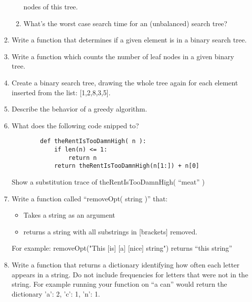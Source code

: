 \documentclass[11pt]{article}
\begin{document}
\begin{enumerate}
\begin{enumerate}
            nodes of this tree.
                \vspace{.25in}
            \item What's the worst case search time for an (unbalanced) search
            tree?
                \pagebreak
        \end{enumerate}
    \item Write a function that determines if a given element is in a binary search tree.
        \vspace{3in}
    \item Write a function which counts the number of leaf nodes in a given binary tree.
        \pagebreak
    \item Create a binary search tree, drawing the whole tree
        again for each element inserted from the list: [1,2,8,3,5].
        \vspace{6in}
    \item Describe the behavior of a greedy algorithm.
        \pagebreak

    \item What does the following code snipped to?
        \begin{verbatim}
        def theRentIsTooDamnHigh( n ):
            if len(n) <= 1:
                return n
            return theRentIsTooDamnHigh(n[1:]) + n[0]
        \end{verbatim}
            \vspace{1in}
        Show a substitution trace of theRentIsTooDamnHigh( ``meat'' )
            \vspace{2in}
    \item Write a function called ``removeOpt( string )'' that:
        \begin{itemize}
            \item Takes a string as an argument
            \item returns a string with all substrings in [brackets] removed.
        \end{itemize}
        For example:    
            removeOpt("This [is] [a] [nice] string")
            returns ``this   string'' 
        \pagebreak
    
    \item Write a function that returns a dictionary identifying how often each
    letter appears in a string. Do not include frequencies for letters that
    were not in the string. For example running your function on ``a can''
    would return the dictionary {'a': 2, 'c': 1, 'n': 1}.
        \vspace{3in}
    

\end{enumerate}
\end{document}
